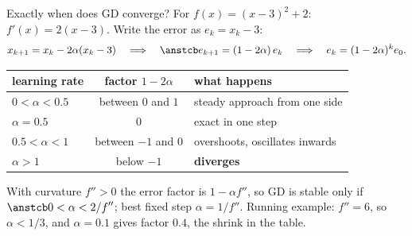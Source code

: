 \begin{frame}{Exactly when does GD converge?}
  \small
  For $f(x) = (x-3)^2 + 2$: $f'(x) = 2(x-3)$. Write the error as $e_k = x_k - 3$:
  \[
    x_{k+1} = x_k - 2\alpha(x_k - 3) \quad\Longrightarrow\quad \ans{e_{k+1} = (1 - 2\alpha)\,e_k}
    \quad\Longrightarrow\quad e_k = (1-2\alpha)^k e_0 .
  \]
  \centering\footnotesize
  \begin{tabular}{@{}l c l@{}}
    \toprule
    learning rate & factor $1 - 2\alpha$ & what happens \\
    \midrule
    $0 < \alpha < 0.5$ & between $0$ and $1$ & steady approach from one side \\
    $\alpha = 0.5$ & $0$ & exact in one step \\
    $0.5 < \alpha < 1$ & between $-1$ and $0$ & overshoots, oscillates inwards \\
    $\alpha > 1$ & below $-1$ & \textcolor{mRed}{\textbf{diverges}} \\
    \bottomrule
  \end{tabular}

  \raggedright
  \vspace{4pt}
  \begin{keybox}
    \footnotesize With curvature $f'' > 0$ the error factor is $1 - \alpha f''$, so GD is stable only if
    $\ans{0 < \alpha < 2/f''}$; best fixed step $\alpha = 1/f''$. Running example: $f'' = 6$, so $\alpha < 1/3$, and
    $\alpha = 0.1$ gives factor $0.4$, the shrink in the table.
  \end{keybox}
\end{frame}

